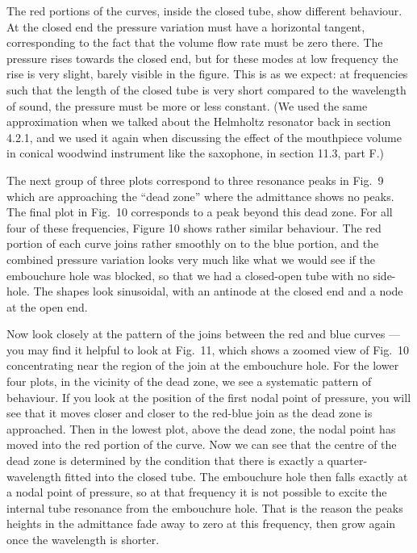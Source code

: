   The red portions of the curves, inside the closed tube, show different 
  behaviour. At the closed end the pressure variation must have a horizontal 
  tangent, corresponding to the fact that the volume flow rate must be zero 
  there. The pressure rises towards the closed end, but for these modes at low 
  frequency the rise is very slight, barely visible in the figure. This is as 
  we expect: at frequencies such that the length of the closed tube is very 
  short compared to the wavelength of sound, the pressure must be more or less 
  constant. (We used the same approximation when we talked about the Helmholtz 
  resonator back in section 4.2.1, and we used it again when discussing the 
  effect of the mouthpiece volume in conical woodwind instrument like the 
  saxophone, in section 11.3, part F.) 

  The next group of three plots correspond to three resonance peaks in Fig.\ 9 
  which are approaching the “dead zone” where the admittance shows no peaks. 
  The final plot in Fig.\ 10 corresponds to a peak beyond this dead zone. For 
  all four of these frequencies, Figure 10 shows rather similar behaviour. The 
  red portion of each curve joins rather smoothly on to the blue portion, and 
  the combined pressure variation looks very much like what we would see if the 
  embouchure hole was blocked, so that we had a closed-open tube with no 
  side-hole. The shapes look sinusoidal, with an antinode at the closed end and 
  a node at the open end. 

  Now look closely at the pattern of the joins between the red and blue curves 
  — you may find it helpful to look at Fig.\ 11, which shows a zoomed view of 
  Fig.\ 10 concentrating near the region of the join at the embouchure hole. 
  For the lower four plots, in the vicinity of the dead zone, we see a 
  systematic pattern of behaviour. If you look at the position of the first 
  nodal point of pressure, you will see that it moves closer and closer to the 
  red-blue join as the dead zone is approached. Then in the lowest plot, above 
  the dead zone, the nodal point has moved into the red portion of the curve. 
  Now we can see that the centre of the dead zone is determined by the 
  condition that there is exactly a quarter-wavelength fitted into the closed 
  tube. The embouchure hole then falls exactly at a nodal point of pressure, so 
  at that frequency it is not possible to excite the internal tube resonance 
  from the embouchure hole. That is the reason the peaks heights in the 
  admittance fade away to zero at this frequency, then grow again once the 
  wavelength is shorter. 

